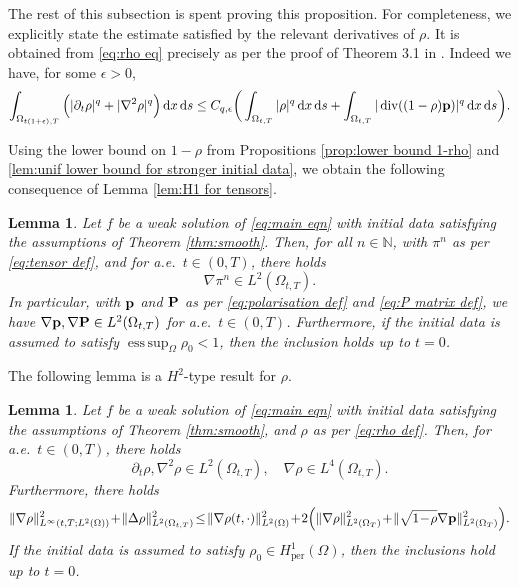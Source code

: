 \documentclass[11pt,a4paper,reqno]{amsart}
\newtheorem{lemma}[prop]{Lemma}
\theoremstyle{remark}
\theoremstyle{definition}
\numberwithin{equation}{section}
\newcommand{\per}{\mathrm{per}}
\DeclareMathOperator{\dv}{div}
\DeclareMathOperator{\esssup}{ess \, sup}
\renewcommand{\P}{{\bf P}}
\newcommand{\p}{{\bf p}}
\renewcommand{\d}{\, \mathrm{d} }
\def\de{\partial}
\begin{document}
The rest of this subsection is spent proving this proposition. For completeness, we explicitly state the estimate satisfied by the relevant derivatives of $\rho$. It is obtained from \eqref{eq:rho eq} precisely as per the proof of Theorem 3.1 in \cite{RosHeat}. Indeed we have, for some $\epsilon>0$,
\begin{equation*}
\int_{\Omega_{t(1+\epsilon),T}} \Big( |\de_t \rho|^q+|\nabla^2 \rho|^q\Big) \d x\d s
\leq
C_{q,\epsilon} \bigg(
\int_{\Omega_{t,T}}  |\rho|^q \d x\d s
+
\int_{\Omega_{t,T}}  |\dv((1-\rho) \p)|^q \d x\d s
\bigg). 
\end{equation*}


Using the lower bound on $1\!-\!\rho$ from Propositions \ref{prop:lower bound 1-rho} and \ref{lem:unif lower bound for stronger initial data}, we obtain the following consequence of Lemma \ref{lem:H1 for tensors}. 
\begin{lemma}\label{cor:H1 p P tensors away from initial time}
Let $f$ be a weak solution of \eqref{eq:main eqn} with initial data satisfying the assumptions of Theorem \ref{thm:smooth}. Then, for all $n\in\mathbb{N}$, with $\pi^n$ as per \eqref{eq:tensor def}, and for a.e.~$t \in (0,T)$, there holds 
    \begin{equation*}
        \nabla \pi^n \in L^2(\Omega_{t,T}). 
    \end{equation*}
    In particular, with $\p$ and $\P$ as per \eqref{eq:polarisation def} and \eqref{eq:P matrix def}, we have $\nabla \p , \nabla \P \in L^2(\Omega_{t,T})$ for a.e.~$t\in(0,T)$. Furthermore, if the initial data is assumed to satisfy $\esssup_\Omega \rho_0 < 1$, then the inclusion holds up to $t=0$. 
\end{lemma}


The following lemma is a $H^2$-type result for $\rho$. 

\begin{lemma}\label{cor:nabla rho in L4}
   Let $f$ be a weak solution of \eqref{eq:main eqn} with initial data satisfying the assumptions of Theorem \ref{thm:smooth}, and $\rho$ as per \eqref{eq:rho def}. Then, for a.e.~$t \in (0,T)$, there holds 
    \begin{equation*}
      \partial_t \rho , \nabla^2 \rho \in L^2(\Omega_{t,T}), \quad  \nabla \rho \in L^4(\Omega_{t,T}). 
    \end{equation*}
    Furthermore, there holds 
  \begin{equation}\label{eq:H2 est for rho in statement}
        \Vert \nabla \rho \Vert_{L^\infty(t,T;L^2(\Omega))}^2 \!+\! \Vert \Delta \rho \Vert^2_{L^2(\Omega_{t,T})} \!\leq\! \Vert \nabla \rho(t,\cdot) \Vert_{L^2(\Omega)}^2 \!+\! 2\Big(\Vert \nabla \rho \Vert^2_{L^2(\Omega_{T})} \!+\! \Vert \sqrt{1\!-\!\rho}\nabla \p \Vert^2_{L^2(\Omega_{T})} \Big). 
    \end{equation}
    If the initial data is assumed to satisfy $\rho_0 \in H^1_\per(\Omega)$, then the inclusions hold up to $t=0$. 
\end{lemma}
\end{document}
